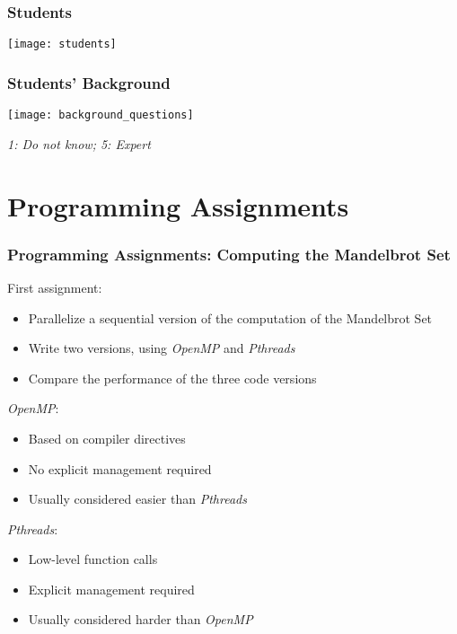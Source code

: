 \documentclass[10pt, compress, aspectratio=169]{beamer}
\begin{document}
\begin{frame}
    \frametitle{Students}
    \begin{center}
        \texttt{[image: students]}
    \end{center}
\end{frame}

\begin{frame}
    \frametitle{Students' Background}
    \begin{center}
        \texttt{[image: background\_questions]}

        \emph{1: Do not know; 5: Expert}
    \end{center}
\end{frame}

\section{Programming Assignments}

\begin{frame}
    \frametitle{Programming Assignments: Computing the Mandelbrot Set}
    First assignment:

    \begin{itemize}
        \item \alert{Parallelize a sequential version} of the computation of the
            Mandelbrot Set
        \item \alert{Write two versions}, using \textit{OpenMP} and \textit{Pthreads}
        \item \alert{Compare the performance} of the three code versions
    \end{itemize}

    \pause

    \textit{OpenMP}:
    \begin{itemize}
        \item Based on compiler directives
        \item No explicit management required
        \item Usually \alert{considered easier} than \textit{Pthreads}
    \end{itemize}

    \pause

    \textit{Pthreads}:
    \begin{itemize}
        \item Low-level function calls
        \item Explicit management required
        \item Usually \alert{considered harder} than \textit{OpenMP}
    \end{itemize}
\end{frame}
\end{document}
